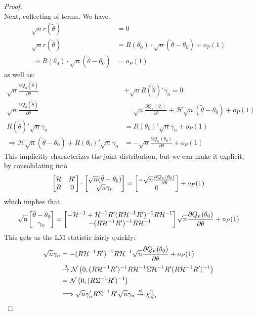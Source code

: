 \documentclass[10pt]{article}
\begin{document}
\begin{proof}
\[	\] 
	Next, collecting of terms. We have:
	\begin{align*}
		\sqrt{n}r(\tilde{\theta}) &= 0 \\
		\sqrt{n}r(\tilde{\theta})  &= R(\theta_0) \cdot \sqrt{n} (\tilde{\theta} - \theta_0) + o_P(1) \\
		\Longrightarrow R(\theta_0) \cdot \sqrt{n} (\tilde{\theta} - \theta_0) &= o_P(1)
	\end{align*}
	as well as:
	\begin{align*}
		\sqrt{n}\frac{\partial Q_n(\tilde{\theta})}{\partial \theta} &+ \sqrt{n}R(\tilde{\theta})'\gamma_n = 0 \\
		\sqrt{n}\frac{\partial Q_n(\tilde{\theta})}{\partial \theta} &= \sqrt{n} \frac{\partial Q_n(\theta_0)}{\partial \theta} + \mathcal{H}\sqrt{n}(\tilde{\theta}-\theta_0) + o_P(1) \\
		R(\tilde{\theta})' \sqrt{n}\gamma_n &= R(\theta_0)' \sqrt{n}\gamma_n + o_P(1)\\
		\Longrightarrow \mathcal{H} \sqrt{n} (\tilde{\theta}-\theta_0) +  R(\theta_0)' \sqrt{n}\gamma_n  &= -\sqrt{n}\frac{\partial Q_n(\theta_0)}{\partial \theta} + o_P(1)
	\end{align*}
	This implicitly characterizes the joint distribution, but we can make it explicit, by consolidating into 
	\[
	\begin{bmatrix}\mathcal{H} & R' \\ R & 0\end{bmatrix} \cdot \begin{bmatrix}\sqrt{n}(\tilde{\theta}-\theta_0) \\ \sqrt{n}\gamma_n\end{bmatrix} = \begin{bmatrix} -\sqrt{n}\frac{\partial Q_n(\theta_0)}{\partial \theta} \\ 0\end{bmatrix} + o_P(1)
	\]
	which implies that
	\[
	\sqrt{n} \begin{bmatrix}\tilde{\theta} - \theta_0 \\ \gamma_n\end{bmatrix} = \begin{bmatrix}-\mathcal{H}^{-1} + \mathcal{H}^{-1}R'(R\mathcal{H}^{-1}R')^{-1}R\mathcal{H}^{-1} \\- (R\mathcal{H}^{-1}R')^{-1}R\mathcal{H}^{-1}\end{bmatrix}\sqrt{n} \frac{\partial Q_n(\theta_0)}{\partial \theta} + o_P(1)
	\]
	This gets us the LM statistic fairly quickly:
	\begin{align*}
		\sqrt{n} \gamma_n &= - (R\mathcal{H}^{-1}R')^{-1}R\mathcal{H}^{-1}\sqrt{n} \frac{\partial Q_n(\theta_0)}{\partial \theta} + o_P(1) \\
		&\todist \normal \parl 0, (R\mathcal{H}^{-1}R')^{-1}R\mathcal{H}^{-1}\Sigma \mathcal{H}^{-1}R'(R\mathcal{H}^{-1}R')^{-1}\parr \\
		&= \normal\parl 0, (R\Sigma^{-1}R')^{-1}\parr \\
		&\Longrightarrow \sqrt{n}\gamma_n' R\Sigma^{-1}R' \sqrt{n}\gamma_n \todist \chi^2_{\#r}

\end{align*}
\end{proof}
\end{document}
